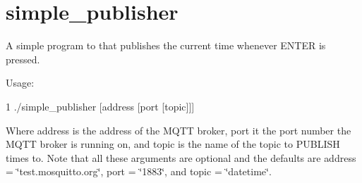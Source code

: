 \hypertarget{simple_publisher-example}{}\section{simple\+\_\+publisher}
A simple program to that publishes the current time whenever E\+N\+T\+ER is pressed.

Usage\+: 
\begin{DoxyCode}
1 ./simple\_publisher [address [port [topic]]]
\end{DoxyCode}


Where {\ttfamily address} is the address of the M\+Q\+TT broker, {\ttfamily port} it the port number the M\+Q\+TT broker is running on, and {\ttfamily topic} is the name of the topic to P\+U\+B\+L\+I\+SH times to. Note that all these arguments are optional and the defaults are {\ttfamily address} = {\ttfamily \char`\"{}test.\+mosquitto.\+org\char`\"{}}, {\ttfamily port} = {\ttfamily \char`\"{}1883\char`\"{}}, and {\ttfamily topic} = \char`\"{}datetime\char`\"{}.


\begin{DoxyCodeInclude}
\end{DoxyCodeInclude}
 